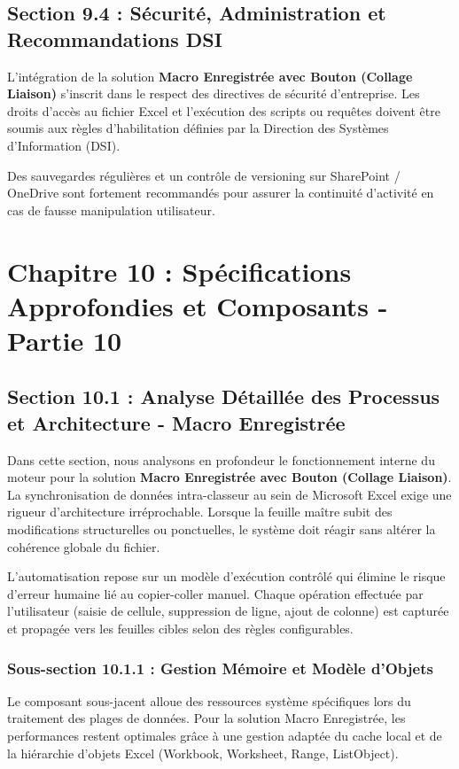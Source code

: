 \documentclass[12pt,a4paper]{report}
\begin{document}
\section{Section 9.4 : Sécurité, Administration et Recommandations DSI}
L'intégration de la solution \textbf{Macro Enregistrée avec Bouton (Collage Liaison)} s'inscrit dans le respect des directives de sécurité d'entreprise. Les droits d'accès au fichier Excel et l'exécution des scripts ou requêtes doivent être soumis aux règles d'habilitation définies par la Direction des Systèmes d'Information (DSI).

Des sauvegardes régulières et un contrôle de versioning sur SharePoint / OneDrive sont fortement recommandés pour assurer la continuité d'activité en cas de fausse manipulation utilisateur.


\chapter{Chapitre 10 : Spécifications Approfondies et Composants - Partie 10}

\section{Section 10.1 : Analyse Détaillée des Processus et Architecture - Macro Enregistrée}
Dans cette section, nous analysons en profondeur le fonctionnement interne du moteur pour la solution \textbf{Macro Enregistrée avec Bouton (Collage Liaison)}. La synchronisation de données intra-classeur au sein de Microsoft Excel exige une rigueur d'architecture irréprochable. Lorsque la feuille maître subit des modifications structurelles ou ponctuelles, le système doit réagir sans altérer la cohérence globale du fichier.

L'automatisation repose sur un modèle d'exécution contrôlé qui élimine le risque d'erreur humaine lié au copier-coller manuel. Chaque opération effectuée par l'utilisateur (saisie de cellule, suppression de ligne, ajout de colonne) est capturée et propagée vers les feuilles cibles selon des règles configurables.


\subsection{Sous-section 10.1.1 : Gestion Mémoire et Modèle d'Objets}
Le composant sous-jacent alloue des ressources système spécifiques lors du traitement des plages de données. Pour la solution Macro Enregistrée, les performances restent optimales grâce à une gestion adaptée du cache local et de la hiérarchie d'objets Excel (Workbook, Worksheet, Range, ListObject).
\end{document}
